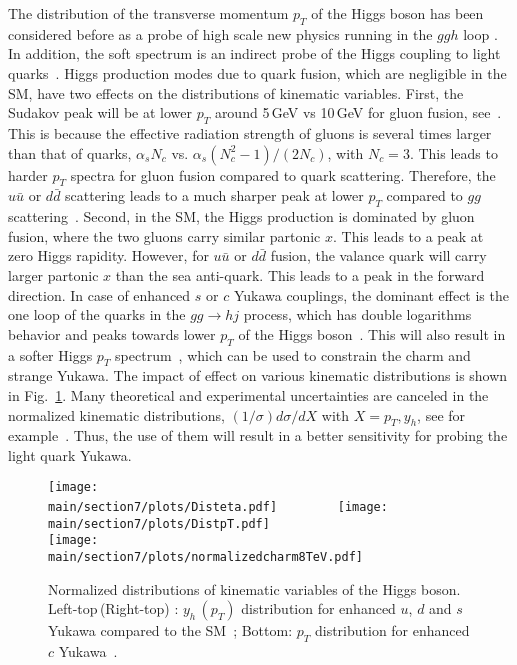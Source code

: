 \documentclass[../report.tex]{subfiles}
\providecommand{\main}{..}
\begin{document}
The distribution of the transverse momentum $p_T$ of the Higgs boson has been considered before as a probe of high scale new physics running in the $ggh$ loop \cite{Arnesen:2008fb,Biekotter:2016ecg,Brehmer:2015rna,Dawson:2015gka,Schlaffer:2014osa,Grojean:2013nya,Langenegger:2015lra,Bramante:2014hua,Buschmann:2014twa,Azatov:2013xha,Banfi:2013yoa,Buschmann:2014sia}. 
In addition, the soft spectrum is an indirect probe of the Higgs coupling to light quarks~\cite{Soreq:2016rae,Bishara:2016jga}. 
Higgs production modes due to quark fusion, which are negligible in the SM, have two effects on the distributions of kinematic variables. 
%
First, the Sudakov peak will be at lower $p_T$ around 5\,GeV vs 10\,GeV for gluon fusion, see~\cite{Collins:1984kg}. This is because the effective radiation strength of gluons is several times larger than that of quarks, $\alpha_s N_c$ vs. $\alpha_s (N^2_c-1)/(2N_c)$, with $N_c=3$. This leads to harder $p_T$ spectra for gluon fusion compared to quark scattering. 
Therefore, the $u\bar{u}$ or $d\bar{d}$ scattering leads to a much sharper peak at lower $p_T$ compared to  $gg$ scattering~\cite{Soreq:2016rae}.
Second, in the SM, the Higgs production is dominated by  gluon fusion, where the two gluons carry similar partonic $x$. This leads to a peak at zero Higgs rapidity. However, for $u\bar u$ or $d\bar d$ fusion, the valance quark will carry larger partonic $x$ than the sea anti-quark. This leads to a peak in the forward direction. 
%
In case of enhanced $s$ or $c$ Yukawa couplings, the dominant effect is the one loop of the quarks in the $gg\to hj$ process, which has double logarithms behavior and peaks towards lower $p_T$ of the Higgs boson~\cite{Baur:1989cm}. This will also result in a softer Higgs $p_T$ spectrum~\cite{Bishara:2016jga}, which can be used to constrain the charm and strange Yukawa. 
%
The impact of effect on various kinematic distributions is shown in Fig.~\ref{fig:HiggsDist}. 
Many theoretical and experimental uncertainties are canceled in  the normalized kinematic distributions, $(1/\sigma)d\sigma/dX$ with $X=p_T, y_h$, see for example~\cite{Soreq:2016rae}.
Thus, the use of them will result in a better sensitivity for probing the light quark Yukawa. 
\begin{figure}[t]
\begin{center}
\texttt{[image: \\main/section7/plots/Disteta.pdf]}~~~~~~~~
\texttt{[image: \\main/section7/plots/DistpT.pdf]}\\
\texttt{[image: \\main/section7/plots/normalizedcharm8TeV.pdf]}
\caption{Normalized distributions of kinematic variables of the Higgs boson. 
Left-top\,(Right-top) : $y_h\,(p_T)$ distribution for enhanced $u$, $d$ and $s$ Yukawa compared to the SM~\cite{Soreq:2016rae};
Bottom: $p_T$ distribution for enhanced $c$ Yukawa~\cite{Bishara:2016jga}. 
}
\label{fig:HiggsDist}
\end{center}
\end{figure}
\end{document}
